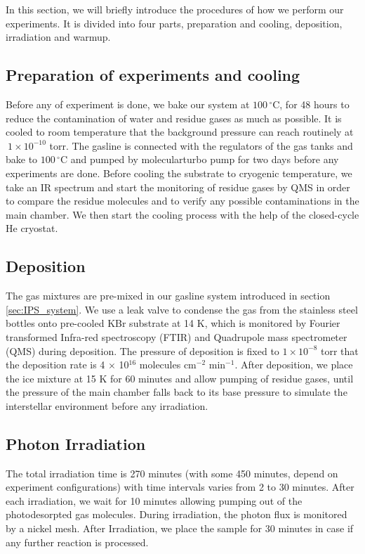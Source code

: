 In this section, we will briefly introduce the  procedures of how we perform our experiments. It is divided into four parts, preparation and cooling, deposition, irradiation and warmup.

\subsection{Preparation of experiments and cooling}
Before any of experiment is done, we bake our system at $100 \,^{\circ}\mathrm{C}$, for 48 hours to reduce the contamination of water and residue gases as much as possible. It is cooled to room temperature that the background pressure can reach routinely at $~ 1 \times 10^{-10}$ torr. The gasline is connected with the regulators of the gas tanks and bake to $100\,^{\circ}\mathrm{C}$ and pumped by molecularturbo pump for two days before any experiments are done. Before cooling the substrate to cryogenic temperature, we take an IR spectrum and start the monitoring of residue gases by QMS in order to compare the residue molecules and to verify any possible contaminations in the main chamber. We then start the cooling process with the help of the closed-cycle He cryostat.

\subsection{Deposition}
The gas mixtures are pre-mixed in our gasline system introduced in section \ref{sec:IPS_system}. We use a leak valve to condense the gas from the stainless steel bottles onto pre-cooled KBr substrate at 14 K, which is monitored by Fourier transformed Infra-red spectroscopy (FTIR) and Quadrupole mass spectrometer (QMS) during deposition. The pressure of deposition is fixed to $1 \times 10^{-8}$ torr that the deposition rate is 4 $\times$ 10$^{16}$ molecules cm$^{-2}$ min$^{-1}$. After deposition, we place the ice mixture at 15 K for 60 minutes and allow pumping of residue gases, until the pressure of the main chamber falls back to its base pressure to simulate the interstellar environment before any irradiation.

\subsection{Photon Irradiation}
The total irradiation time is 270 minutes (with some 450 minutes, depend on experiment configurations) with time intervals varies from 2 to 30 minutes. After each irradiation, we wait for 10 minutes allowing pumping out of the photodesorpted gas molecules. During irradiation, the photon flux is monitored by a nickel mesh. After Irradiation, we place the sample for 30 minutes in case if any further reaction is processed.

